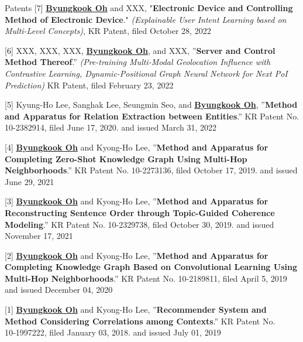 \documentclass{resume} %
\newcommand{\me}[1]{\underline{\textbf{#1}}}  %
\begin{document}
	\begin{rSection}{Patents}
		[7] \me{Byungkook Oh} and XXX, "\textbf{Electronic Device and Controlling Method of Electronic Device}." \textit{(Explainable User Intent Learning based on Multi-Level Concepts)}, KR Patent, filed October 28, 2022
		
		[6] XXX, XXX, XXX, \me{Byungkook Oh}, and XXX, ”\textbf{Server and Control Method Thereof}.” \textit{(Pre-training Multi-Modal Geolocation Influence with Contrastive Learning, Dynamic-Positional Graph Neural Network for Next PoI Prediction)} KR Patent, filed February 23, 2022
		
		[5] Kyung-Ho Lee, Sanghak Lee, Seungmin Seo, and \me{Byungkook Oh}, ”\textbf{Method and Apparatus for Relation Extraction between Entities}.” KR Patent No. 10-2382914, filed June 17, 2020. and issued March 31, 2022
		
		[4] \me{Byungkook Oh} and Kyong-Ho Lee, ”\textbf{Method and Apparatus for Completing Zero-Shot Knowledge Graph Using Multi-Hop Neighborhoods}.” KR Patent No. 10-2273136, filed October 17, 2019. and issued June 29, 2021
		
		[3] \me{Byungkook Oh} and Kyong-Ho Lee, ”\textbf{Method and Apparatus for Reconstructing Sentence Order through Topic-Guided Coherence Modeling}.” KR Patent No. 10-2329738, filed October 30, 2019. and issued November 17, 2021
		
		[2] \me{Byungkook Oh} and Kyong-Ho Lee, ”\textbf{Method and Apparatus for Completing Knowledge Graph Based on Convolutional Learning Using Multi-Hop Neighborhoods}.” KR Patent No. 10-2189811, filed April 5, 2019 and issued December 04, 2020
		
		[1] \me{Byungkook Oh} and Kyong-Ho Lee, ”\textbf{Recommender System and Method Considering Correlations among Contexts}.” KR Patent No. 10‑1997222, filed January 03, 2018. and issued July 01, 2019
	\end{rSection}
\end{document}

